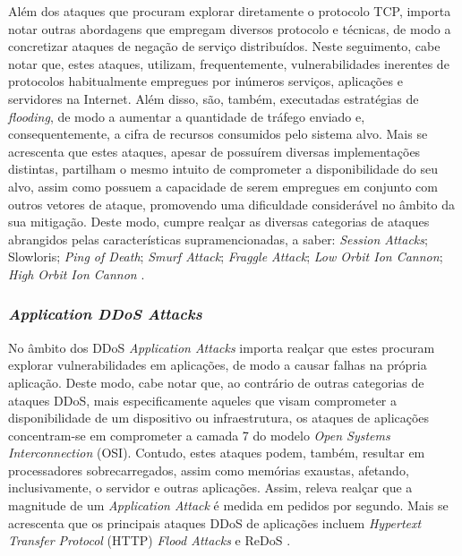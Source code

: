 Além dos ataques que procuram explorar diretamente o protocolo TCP, importa notar outras abordagens que empregam diversos protocolo e técnicas, de modo a concretizar ataques de negação de serviço distribuídos. Neste seguimento, cabe notar que, estes ataques, utilizam, frequentemente, vulnerabilidades inerentes de protocolos habitualmente empregues por inúmeros serviços, aplicações e servidores na Internet. Além disso, são, também, executadas estratégias de \textit{flooding}, de modo a aumentar a quantidade de tráfego enviado e, consequentemente, a cifra de recursos consumidos pelo sistema alvo. Mais se acrescenta que estes ataques, apesar de possuírem diversas implementações distintas, partilham o mesmo intuito de comprometer a disponibilidade do seu alvo, assim como possuem a capacidade de serem empregues em conjunto com outros vetores de ataque, promovendo uma dificuldade considerável no âmbito da sua mitigação. Deste modo, cumpre realçar as diversas categorias de ataques abrangidos pelas características supramencionadas, a saber: \textit{Session Attacks}; Slowloris; \textit{Ping of Death}; \textit{Smurf Attack}; \textit{Fraggle Attack}; \textit{Low Orbit Ion Cannon}; \textit{High Orbit Ion Cannon} \cite{esecurityplanet_types_of_ddos_attacks,connectwise_types_of_ddos_attacks}.

\subsubsection{\textit{Application DDoS Attacks}}
No âmbito dos DDoS \textit{Application Attacks} importa realçar que estes procuram explorar vulnerabilidades em aplicações, de modo a causar falhas na própria aplicação. Deste modo, cabe notar que, ao contrário de outras categorias de ataques DDoS, mais especificamente aqueles que visam comprometer a disponibilidade de um dispositivo ou infraestrutura, os ataques de aplicações concentram-se em comprometer a camada 7 do modelo \textit{Open Systems Interconnection} (OSI). Contudo, estes ataques podem, também, resultar em processadores sobrecarregados, assim como memórias exaustas, afetando, inclusivamente, o servidor e outras aplicações. Assim, releva realçar que a magnitude de um \textit{Application Attack} é medida em pedidos por segundo. Mais se acrescenta que os principais ataques DDoS de aplicações incluem \textit{Hypertext Transfer Protocol} (HTTP) \textit{Flood Attacks} e ReDoS \cite{esecurityplanet_types_of_ddos_attacks,connectwise_types_of_ddos_attacks}.


